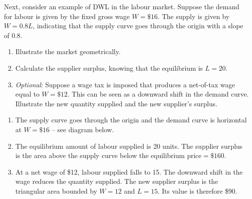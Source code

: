 \begin{enumialphparenastyle}
\begin{econex}\label{ex:ch5ex3}
Next, consider an example of DWL in the labour market. Suppose the demand for labour is given by the fixed gross wage $W=\$16$. The supply is given by $W=0.8L$, indicating that the supply curve goes through the origin with a slope of 0.8.
\begin{enumerate}
\item	Illustrate the market geometrically.
\item	Calculate the supplier surplus, knowing that the equilibrium is $L=20$.
\item	\textit{Optional}: Suppose a wage tax is imposed that produces a net-of-tax wage equal to $W=\$12$. This can be seen as a downward shift in the demand curve. Illustrate the new quantity supplied and the new supplier's surplus. 
\end{enumerate}
\begin{econsolution}
\begin{enumerate}
\item	The supply curve goes through the origin and the demand curve is horizontal at $W=\$16$ -- see diagram below.
\item	The equilibrium amount of labour supplied is 20 units. The supplier surplus is the area above the supply curve below the
equilibrium price$=\$160$.
\item	At a net wage of \$12, labour supplied falls to 15. The downward shift in the wage reduces the quantity supplied. The new supplier surplus is the triangular area bounded by $W=12$ and $L=15$. Its value is therefore \$90.
\end{enumerate}
\begin{center*}
\end{center*}
\end{econsolution}
\end{econex}


\end{enumialphparenastyle}
